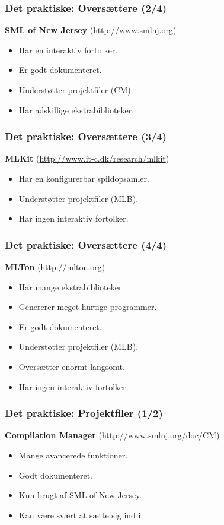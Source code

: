 \documentclass[slidestop,compress,mathserif, xcolor=table]{beamer}
\begin{document}
\begin{frame}
  \frametitle{Det praktiske: Oversættere \quad (2/4)}
  \textbf{SML of New Jersey} {\scriptsize(\url{http://www.smlnj.org})}
  \begin{itemize}
  \item Har en interaktiv fortolker.
  \item Er godt dokumenteret.
  \item Understøtter projektfiler (CM).
  \item Har adskillige ekstrabiblioteker.
  \end{itemize}
\end{frame}

\begin{frame}
  \frametitle{Det praktiske: Oversættere \quad (3/4)}
  \textbf{MLKit} {\scriptsize(\url{http://www.it-c.dk/research/mlkit})}
  \begin{itemize}
  \item Har en konfigurerbar spildopsamler.
  \item Understøtter projektfiler (MLB).
  \item Har ingen interaktiv fortolker.
  \end{itemize}
\end{frame}

\begin{frame}
  \frametitle{Det praktiske: Oversættere \quad (4/4)}
  \textbf{MLTon} {\scriptsize(\url{http://mlton.org})}
  \begin{itemize}
  \item Har mange ekstrabiblioteker.
  \item Genererer meget hurtige programmer.
  \item Er godt dokumenteret.
  \item Understøtter projektfiler (MLB).
  \item Oversætter enormt langsomt.
  \item Har ingen interaktiv fortolker.
  \end{itemize}
\end{frame}

\begin{frame}
  \frametitle{Det praktiske: Projektfiler \quad (1/2)}
  \textbf{Compilation Manager}
  {\scriptsize(\url{http://www.smlnj.org/doc/CM})}
  \begin{itemize}
  \item Mange avancerede funktioner.
  \item Godt dokumenteret.
  \item Kun brugt af SML of New Jersey.
  \item Kan være svært at sætte sig ind i.
  \end{itemize}
\end{frame}
\end{document}
